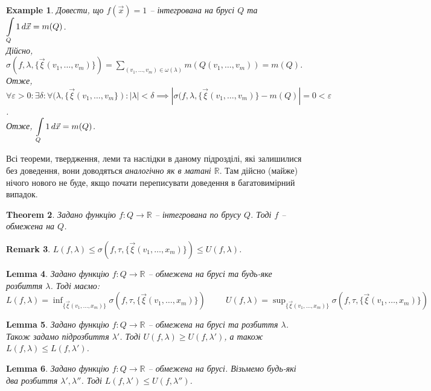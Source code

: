 \documentclass[a4paper, 10pt]{article}
\theoremstyle{theoremdd}
\newtheorem{theorem}{Theorem}[subsection]
\theoremstyle{theoremdd}
\theoremstyle{theoremdd}
\theoremstyle{theoremdd}
\newtheorem{example}[theorem]{Example}
\theoremstyle{theoremdd}
\theoremstyle{theoremdd}
\newtheorem{remark}[theorem]{Remark}
\theoremstyle{theoremdd}
\newtheorem{lemma}[theorem]{Lemma}
\theoremstyle{theoremdd}
\begin{document}
\begin{example}
Довести, що $f(\vec{x}) = 1$ -- інтегрована на брусі $Q$ та $\displaystyle\int\displaylimits_Q 1\,d\vec{x} = m(Q)$.\\
Дійсно, $\displaystyle\sigma(f,\lambda,\{\vec{\xi}(v_1,\dots,v_m) \}) = \sum_{(v_1,\dots,v_m) \in \omega(\lambda)} m(Q(v_1,\dots,v_m)) = m(Q)$.\\
Отже, $\forall \varepsilon > 0: \exists \delta: \forall (\lambda, \{ \vec{\xi}(v_1,\dots,v_m \}): |\lambda| < \delta \implies |\sigma(f,\lambda,\{ \vec{\xi}(v_1,\dots,v_m) \} - m(Q)| = 0 < \varepsilon$.\\
Отже, $\displaystyle\int\displaylimits_Q 1\,d\vec{x} = m(Q)$.
\end{example}

Всі теореми, твердження, леми та наслідки в даному підрозділі, які залишилися без доведення, вони доводяться \textit{аналогічно як в матані $\mathbb{R}$}. Там дійсно (майже) нічого нового не буде, якщо почати переписувати доведення в багатовимірний випадок.

\begin{theorem}
Задано функцію $f \colon Q \to \mathbb{R}$ -- інтегрована по брусу $Q$. Тоді $f$ -- обмежена на $Q$.
\end{theorem}

\begin{remark}
$L(f,\lambda) \leq \sigma(f,\tau,\{ \vec{\xi}(v_1,\dots,x_m) \}) \leq U(f,\lambda)$.
\end{remark}

\begin{lemma}
Задано функцію $f \colon Q \to \mathbb{R}$ -- обмежена на брусі та будь-яке розбиття $\lambda$. Тоді маємо:\\
$L(f,\lambda) = \displaystyle\inf_{\{ \vec{\xi}(v_1,\dots,x_m) \}} \sigma(f,\tau,\{ \vec{\xi}(v_1,\dots,x_m) \}) \hspace{1cm} U(f,\lambda) = \displaystyle\sup_{\{ \vec{\xi}(v_1,\dots,x_m) \}} \sigma(f,\tau,\{ \vec{\xi}(v_1,\dots,x_m) \})$
\end{lemma}

\begin{lemma}
Задано функцію $f \colon Q \to \mathbb{R}$ -- обмежена на брусі та розбиття $\lambda$. Також задамо підрозбиття $\lambda'$. Тоді $U(f,\lambda) \geq U(f,\lambda')$, а також $L(f,\lambda) \leq L(f,\lambda')$.
\end{lemma}

\begin{lemma}
Задано функцію $f \colon Q \to \mathbb{R}$ -- обмежена на брусі. Візьмемо будь-які два розбиття $\lambda', \lambda''$. Тоді $L(f,\lambda') \leq U(f,\lambda'')$.
\end{lemma}
\end{document}
